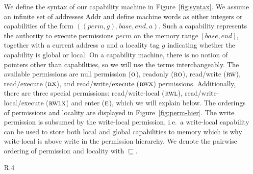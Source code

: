 \documentclass[format=acmsmall, review=true, screen=true]{acmart}
\renewcommand{\figurename}{Figure}
\newcommand{\var}[1]{\mathit{#1}}
\newcommand{\gl}{\var{g}}
\newcommand{\addr}{\var{a}}
\newcommand{\perm}{\var{perm}}
\newcommand{\plaindom}[1]{\mathrm{#1}}
\newcommand{\Addrs}{\plaindom{Addr}}
\newcommand{\plainperm}[1]{\textsc{#1}}
\newcommand{\noperm}{\plainperm{o}}
\newcommand{\readonly}{\plainperm{ro}}
\newcommand{\readwrite}{\plainperm{rw}}
\newcommand{\exec}{\plainperm{rx}}
\newcommand{\entry}{\plainperm{e}}
\newcommand{\rwx}{\plainperm{rwx}}
\newcommand{\readwritel}{\plainperm{rwl}}
\newcommand{\rwlx}{\plainperm{rwlx}}
\newcommand{\plainlocality}[1]{\mathrm{#1}}
\newcommand{\local}{\plainlocality{local}}
\newcommand{\glob}{\plainlocality{global}}
\newcommand{\itoplas}[1]%
    {{\color{OliveGreen} #1}}
\begin{document}
We define the syntax of our capability machine in \figurename~\ref{fig:syntax}.
We assume an infinite set of addresses $\Addrs$ and define machine words as either integers or capabilities of the form $((\perm,\gl),\var{base},\var{end},\addr)$.
Such a capability represents the authority to execute permissions $\perm$ on the memory range $[\var{base},\var{end}]$, together with a current address $\addr$ and a locality tag $\gl$ indicating whether the capability is global or local.
On a capability machine, there is no notion of pointers other than capabilities, so we will use the terms interchangeably.
The available permissions are null permission ($\noperm$), readonly ($\readonly$), read/write ($\readwrite$), read/execute ($\exec$), and read/write/execute ($\rwx$) permissions.
Additionally, there are three special permissions: read/write-local ($\readwritel$), read/write-local/execute ($\rwlx$) and enter ($\entry$), which we will explain below.
\itoplas{The orderings of permissions and locality are displayed in \figurename~\ref{fig:perm-hier}.
  The write permission is subsumed by the write-local permission, i.e.\ a write-local capability can be used to store both $\local$ and $\glob$ capabilities to memory which is why write-local is above write in the permission hierarchy.
  We denote the pairwise ordering of permission and locality with $\sqsubseteq$.}

\begin{wrapfigure}{R}{.4\textwidth}
  \centering
  \caption{Permission and locality hierarchy.}
  \label{fig:perm-hier}
\end{wrapfigure}
\end{document}
